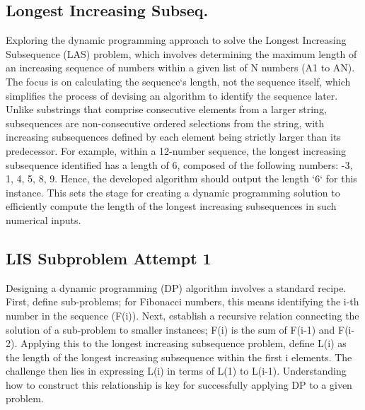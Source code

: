 \subsection*{Longest Increasing Subseq.}
Exploring the dynamic programming approach to solve the Longest Increasing Subsequence (LAS) problem, which involves determining the maximum length of an increasing sequence of numbers within a given list of N numbers (A1 to AN).
The focus is on calculating the sequence`s length, not the sequence itself, which simplifies the process of devising an algorithm to identify the sequence later.
Unlike substrings that comprise consecutive elements from a larger string, subsequences are non-consecutive ordered selections from the string, with increasing subsequences defined by each element being strictly larger than its predecessor.
For example, within a 12-number sequence, the longest increasing subsequence identified has a length of 6, composed of the following numbers: -3, 1, 4, 5, 8, 9.
Hence, the developed algorithm should output the length `6` for this instance.
This sets the stage for creating a dynamic programming solution to efficiently compute the length of the longest increasing subsequences in such numerical inputs.

\subsection*{LIS  Subproblem Attempt 1}
Designing a dynamic programming (DP) algorithm involves a standard recipe.
First, define sub-problems; for Fibonacci numbers, this means identifying the i-th number in the sequence (F(i)).
Next, establish a recursive relation connecting the solution of a sub-problem to smaller instances; F(i) is the sum of F(i-1) and F(i-2).
Applying this to the longest increasing subsequence problem, define L(i) as the length of the longest increasing subsequence within the first i elements.
The challenge then lies in expressing L(i) in terms of L(1) to L(i-1).
Understanding how to construct this relationship is key for successfully applying DP to a given problem.

